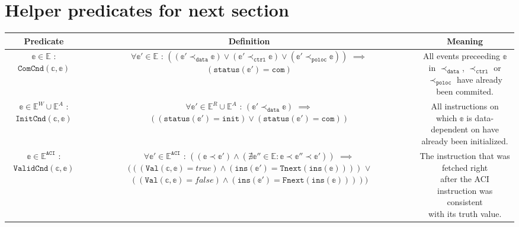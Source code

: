 \documentclass{article}
\begin{document}
\section{Helper predicates for next section}
\begin{center}
 \begin{tabular}{||c | c | c ||} 
 \hline
 \textbf{Predicate} & \textbf{Definition} & \textbf{Meaning} \\ [0.5ex] 
 \hline\hline
 \makecell{$\mathbb{e} \in \mathbb{E}$ :\\ $\texttt{ComCnd}(\mathbb{c},\mathbb{e})$} & \makecell{$\forall \mathbb{e'} \in \mathbb{E}$ :\\$((\mathbb{e}' \prec_\texttt{data} \mathbb{e}) \vee (\mathbb{e'} \prec_\texttt{ctrl} \mathbb{e}) \vee (\mathbb{e'} \prec_\texttt{poloc} \mathbb{e}))$ \\ $\implies$ \\ $(\texttt{status}(\mathbb{e'}) = \texttt{com})$} & \makecell{All events preceeding $\mathbb{e}$ in $\prec_\texttt{data}$, $\prec_\texttt{ctrl}$\\ or $\prec_\texttt{poloc}$ have already been commited.}  \\
 \hline
 \makecell{$\mathbb{e} \in \mathbb{E}^W \cup \mathbb{E}^A $ : \\ $\texttt{InitCnd}(\mathbb{c},\mathbb{e})$} & \makecell{$\forall \mathbb{e}' \in \mathbb{E}^R \cup \mathbb{E}^A$ :\\$(\mathbb{e}' \prec_\texttt{data} \mathbb{e})$ \\ $\implies$ \\ $((\texttt{status}(\mathbb{e'}) = \texttt{init}) \vee (\texttt{status}(\mathbb{e}') = \texttt{com}))$ } & \makecell{All instructions on which $\mathbb{e}$ is data-dependent\\ on have already been initialized. } \\
 \hline
 \makecell{$\mathbb{e} \in \mathbb{E}^\texttt{ACI}$ :\\$\texttt{ValidCnd}(\mathbb{c},\mathbb{e})$} & \makecell{$\forall \mathbb{e}' \in \mathbb{E}^\texttt{ACI}$ :\\$((\mathbb{e} \prec \mathbb{e}') \wedge (\nexists \mathbb{e}'' \in \mathbb{E} : \mathbb{e} \prec \mathbb{e''} \prec \mathbb{e'}))$\\$\implies$\\$(((\texttt{Val}(\mathbb{c},\mathbb{e}) = true) \wedge (\texttt{ins}(\mathbb{e'}) = \texttt{Tnext}(\texttt{ins}(\mathbb{e}))))$\\$\vee$\\$((\texttt{Val}(\mathbb{c},\mathbb{e}) = false) \wedge (\texttt{ins}(\mathbb{e}') = \texttt{Fnext}(\texttt{ins}(\mathbb{e})))))$} & \makecell{The instruction that was fetched right\\ after the ACI instruction was consistent\\ with its truth value.} \\
 \hline
 
 \hline
\end{tabular}
\end{center}
\end{document}

